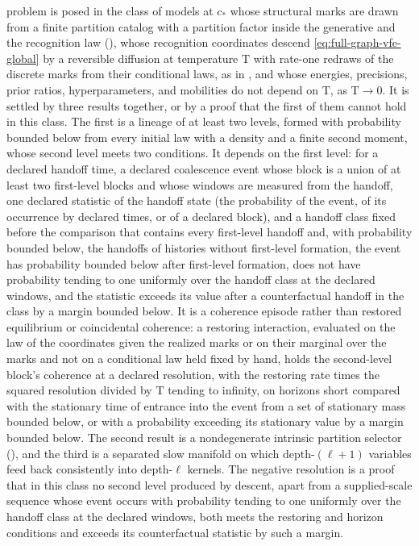 problem is posed in the class of models at $c_*$ whose structural marks are drawn from
a finite partition catalog with a partition factor inside the generative and the
recognition law (),
whose recognition coordinates descend \eqref{eq:full-graph-vfe-global} by a reversible
diffusion at temperature $\mathrm T$ with rate-one redraws of the discrete marks from
their conditional laws, as in , and whose
energies, precisions, prior ratios, hyperparameters, and mobilities do not depend on
$\mathrm T$, as $\mathrm T\to0$. It is settled by three results together, or by a
proof that the first of them cannot hold in this class. The first is a lineage of at
least two levels, formed with probability bounded below from every initial law with a
density and a finite second moment, whose second level meets two conditions. It
depends on the first level: for a declared handoff time, a declared coalescence event
whose block is a union of at least two first-level blocks and whose windows are
measured from the handoff, one declared statistic of the handoff state (the
probability of the event, of its occurrence by declared times, or of a declared
block), and a handoff class fixed before the comparison that contains every
first-level handoff and, with probability bounded below, the handoffs of histories
without first-level formation, the event has probability bounded below after
first-level formation, does not have probability tending to one uniformly over the
handoff class at the declared windows, and the statistic exceeds its value after a
counterfactual handoff in the class by a margin bounded below. It is a coherence
episode rather than restored equilibrium or coincidental coherence: a restoring
interaction, evaluated on the law of the coordinates given the realized marks or on
their marginal over the marks and not on a conditional law held fixed by hand, holds
the second-level block's coherence at a declared resolution, with the restoring rate
times the squared resolution divided by $\mathrm T$ tending to infinity, on horizons
short compared with the stationary time of entrance into the event from a set of
stationary mass bounded below, or with a probability exceeding its stationary value by
a margin bounded below. The second result is a nondegenerate intrinsic partition
selector (), and the third is a separated slow manifold
on which depth-$(\ell+1)$ variables feed back consistently into depth-$\ell$ kernels.
The negative resolution is a proof that in this class no second level produced by
descent, apart from a supplied-scale sequence whose event occurs with probability
tending to one uniformly over the handoff class at the declared windows, both meets
the restoring and horizon conditions and exceeds its counterfactual statistic by
such a margin.

